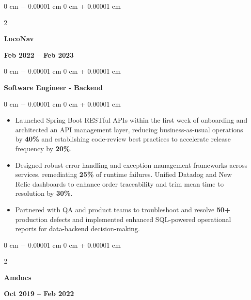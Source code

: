 \documentclass[10pt, letterpaper]{article}
\newenvironment{highlights}{
    \begin{itemize}[
        topsep=0.10 cm,
        parsep=0.10 cm,
        partopsep=0pt,
        itemsep=0pt,
        leftmargin=0 cm + 10pt
    ]
}{
    \end{itemize}
} %
\newenvironment{onecolentry}{
    \begin{adjustwidth}{
        0 cm + 0.00001 cm
    }{
        0 cm + 0.00001 cm
    }
}{
    \end{adjustwidth}
} %
\newenvironment{twocolentry}[2][]{
    \onecolentry
    \def\secondColumn{#2}
    \setcolumnwidth{\fill, 4.5 cm}
    \begin{paracol}{2}
}{
    \switchcolumn \raggedleft \secondColumn
    \end{paracol}
    \endonecolentry
} %
\begin{document}
        \vspace{0.1 cm}
        \begin{twocolentry}{\textbf{Feb 2022 – Feb 2023}}
            \textbf{LocoNav}
            \end{twocolentry}
            \begin{onecolentry}
                \textbf{Software Engineer - Backend}
            \end{onecolentry}
        \vspace{0.10 cm}
        \begin{onecolentry}
            \begin{highlights}
                \item Launched Spring Boot RESTful APIs within the first week of onboarding and architected an API management layer, reducing business-as-usual operations by \textbf{40\%} and establishing code-review best practices to accelerate release frequency by \textbf{20\%}.
                
                
                \item Designed robust error-handling and exception-management frameworks across services, remediating \textbf{25\%} of runtime failures. Unified Datadog and New Relic dashboards to enhance order traceability and trim mean time to resolution by \textbf{30\%}.

                \item Partnered with QA and product teams to troubleshoot and resolve \textbf{50+} production defects and implemented enhanced SQL-powered operational reports for data-backend decision-making.
            \end{highlights}
        \end{onecolentry}


        \vspace{0.1 cm}
        \begin{twocolentry}{\textbf{Oct 2019 – Feb 2022}}
            \textbf{Amdocs}
        \end{twocolentry}
        
\end{document}

